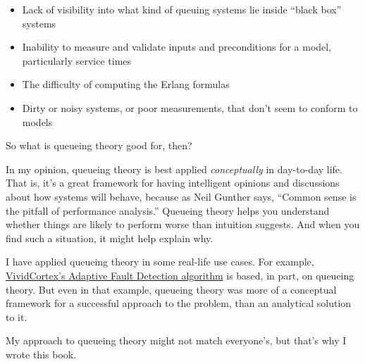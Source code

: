 \documentclass{vivid_layout}
\begin{document}
\begin{itemize}
\item Lack of visibility into what kind of queuing systems lie inside ``black box'' systems
\item Inability to measure and validate inputs and preconditions for a model, particularly service times
\item The difficulty of computing the Erlang formulas
\item Dirty or noisy systems, or poor measurements, that don't seem to conform to models
\end{itemize}

So what is queueing theory good for, then?

In my opinion, queueing theory is best applied {\itshape conceptually} in day-to-day life. That is, it's a great framework for having intelligent opinions and discussions about how systems will behave, because as Neil Gunther says, ``Common sense is the pitfall of performance analysis.'' Queueing theory helps you understand whether things are likely to perform worse than intuition suggests. And when you find such a situation, it might help explain why.

I have applied queueing theory in some real-life use cases. For example, \href{https://www.vividcortex.com/blog/2013/04/17/how-does-adaptive-fault-detection-work-does-it-really-eliminate-thresholds/}{VividCortex's Adaptive Fault Detection algorithm} is based, in part, on queueing theory. But even in that example, queueing theory was more of a conceptual framework for a successful approach to the problem, than an analytical solution to it.

My approach to queueing theory might not match everyone's, but that's why I wrote this book.
\end{document}
